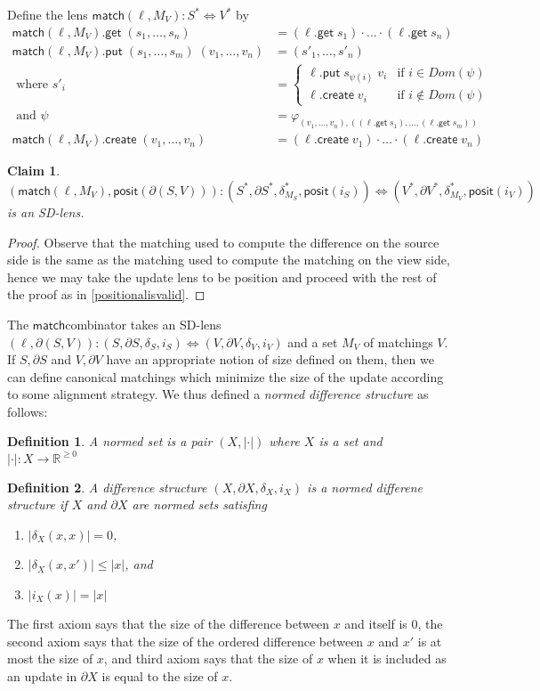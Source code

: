 \documentclass[acmsmall,review,anonymous]{acmart}\settopmatter{printfolios=true,printccs=false,printacmref=false}
\newtheorem{definition}{Definition}
\newtheorem{claim}{Claim}
\newcommand{\kw}[1]{\ensuremath{\mathsf{#1}}}
\newcommand{\get}{\ensuremath{\kw{get}}}
\newcommand{\pput}{\ensuremath{\kw{put}}}
\newcommand{\create}{\ensuremath{\kw{create}}}
\newcommand{\pos}{\ensuremath{\kw{posit}}}
\newcommand{\match}{\ensuremath{\kw{match}}}
\begin{document}
Define the lens $\match(\ell, M_V) : S^* \Leftrightarrow V^*$ by
\begin{align*}
\match(\ell, M_V) .\get \; (s_1, \ldots, s_n) &= (\ell.\get \; s_1) \cdot
\ldots \cdot (\ell.\get \; s_n)\\
\match(\ell, M_V) .\pput \; (s_1, \ldots, s_m) \; (v_1, \ldots, v_n) &= (s'_1
, \ldots , s'_n)\\
\text{ where } s'_i &= \begin{cases}
\ell.\pput \; s_{\psi(i)} \; v_i & \text{if } i \in Dom(\psi)\\
\ell.\create \; v_i & \text{if } i \not \in Dom(\psi)
\end{cases}\\
\text{ and } \psi &= \varphi_{(v_1, \ldots, v_n), ((\ell.\get \; s_1), \ldots,
(\ell.\get \; s_m))}\\
\match(\ell, M_V).\create \; (v_1, \ldots, v_n) &= (\ell.\create \; v_1) \cdot
\ldots \cdot (\ell.\create \; v_n)
\end{align*}
\begin{claim}
$(\match(\ell, M_V), \pos(\partial (S, V))) : (S^*, \partial S^*, \delta^*_{M_S},
\pos(i_{S})) \Leftrightarrow (V^*, \partial V^*, \delta^*_{M_V}, \pos(i_{V}))$
is an SD-lens.
\end{claim}
\begin{proof}
Observe that the matching used to compute the difference on the source side is
the same as the matching used to compute the matching on the view side, hence we
may take the update lens to be position and proceed with the rest of the proof
as in \cref{positionalisvalid}.
\end{proof}
The \match combinator takes an SD-lens $(\ell, \partial (S, V)) : (S, \partial
S, \delta_{S}, i_{S}) \Leftrightarrow (V, \partial V, \delta_{V}, i_{V})$ and a
set $M_V$ of matchings $V$. If $S, \partial S$ and $V, \partial V$ have an
appropriate notion of size defined on them, then we can define canonical
matchings which minimize the size of the update according to some alignment
strategy. We thus defined a {\em normed difference structure} as follows:
\begin{definition}
A normed set is a pair $(X, |\cdot|)$ where $X$ is a set and $|\cdot| : X
\longrightarrow \mathbb{R}^{\geq 0}$
\end{definition}
\begin{definition}
A difference structure $(X, \partial X, \delta_X, i_X)$ is a normed differene
structure if $X$ and $\partial X$ are normed sets satisfing
\begin{enumerate}
  \item
  $|\delta_X(x, x)| = 0$,
  \item
  $|\delta_X(x, x')| \leq |x|$, and
  \item
  $|i_X(x)| = |x|$
\end{enumerate}
\end{definition}
The first axiom says that the size of the difference between $x$ and itself is
0, the second axiom says that the size of the ordered difference between $x$
and $x'$ is at most the size of $x$, and third axiom says that the size of $x$
when it is included as an update in $\partial X$ is equal to the size of $x$.
\end{document}
